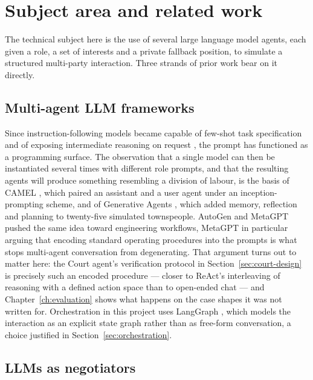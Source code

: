 \section{Subject area and related work}
\label{sec:related}

The technical subject here is the use of several large language model agents,
each given a role, a set of interests and a private fallback position, to
simulate a structured multi-party interaction. Three strands of prior work bear
on it directly.

\subsection*{Multi-agent LLM frameworks}

Since instruction-following models became capable of few-shot task specification
\cite{brown2020language} and of exposing intermediate reasoning on request
\cite{wei2022chain}, the prompt has functioned as a programming surface. The
observation that a single model can then be instantiated several times
with different role prompts, and that the resulting agents will produce something
resembling a division of labour, is the basis of CAMEL \cite{li2023camel}, which
paired an assistant and a user agent under an inception-prompting scheme, and of
Generative Agents \cite{park2023generative}, which added memory, reflection and
planning to twenty-five simulated townspeople. AutoGen \cite{wu2023autogen} and
MetaGPT \cite{hong2024metagpt} pushed the same idea toward engineering
workflows, MetaGPT in particular arguing that encoding standard operating
procedures into the prompts is what stops multi-agent conversation from
degenerating. That argument turns out to matter here: the Court agent's
verification protocol in Section~\ref{sec:court-design} is precisely such an
encoded procedure --- closer to ReAct's interleaving of reasoning with a defined
action space \cite{yao2023react} than to open-ended chat --- and
Chapter~\ref{ch:evaluation} shows what happens on the case
shapes it was not written for. Orchestration in this project uses LangGraph
\cite{langgraph}, which models the interaction as an explicit state graph rather
than as free-form conversation, a choice justified in Section~\ref{sec:orchestration}.

\subsection*{LLMs as negotiators}

